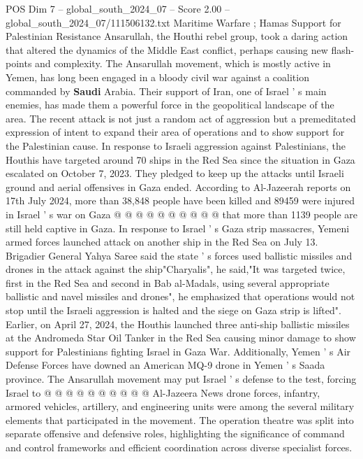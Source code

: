 \begin{textsample}{POS Dim 7 – global\_south\_2024\_07 – Score 2.00 – global\_south\_2024\_07/111506132.txt}  \label{ex:f7_pos_111}
Maritime Warfare ; Hamas Support for Palestinian Resistance Ansarullah, the Houthi rebel group, took a daring action that altered the dynamics of the Middle East conflict, perhaps causing new flash-points and complexity.
The Ansarullah movement, which is mostly active in Yemen, has long been engaged in a bloody civil war against a coalition commanded by \textbf{Saudi} Arabia.
Their support of Iran, one of Israel ' s main enemies, has made them a powerful force in the geopolitical landscape of the area.
The recent attack is not just a random act of aggression but a premeditated expression of intent to expand their area of operations and to show support for the Palestinian cause.
In response to Israeli aggression against Palestinians, the Houthis have targeted around 70 ships in the Red Sea since the situation in Gaza escalated on October 7, 2023.
They pledged to keep up the attacks until Israeli ground and aerial offensives in Gaza ended.
According to Al-Jazeerah reports on 17th July 2024, more than 38,848 people have been killed and 89459 were injured in Israel ' s war on Gaza @ @ @ @ @ @ @ @ @ @ that more than 1139 people are still held captive in Gaza.
In response to Israel ' s Gaza strip massacres, Yemeni armed forces launched attack on another ship in the Red Sea on July 13.
Brigadier General Yahya Saree said the state ' s forces used ballistic missiles and drones in the attack against the ship"Charyalis", he said,"It was targeted twice, first in the Red Sea and second in Bab al-Madals, using several appropriate ballistic and navel missiles and drones", he emphasized that operations would not stop until the Israeli aggression is halted and the siege on Gaza strip is lifted".
Earlier, on April 27, 2024, the Houthis launched three anti-ship ballistic missiles at the Andromeda Star Oil Tanker in the Red Sea causing minor damage to show support for Palestinians fighting Israel in Gaza War.
Additionally, Yemen ' s Air Defense Forces have downed an American MQ-9 drone in Yemen ' s Saada province.
The Ansarullah movement may put Israel ' s defense to the test, forcing Israel to @ @ @ @ @ @ @ @ @ @ Al-Jazeera News drone forces, infantry, armored vehicles, artillery, and engineering units were among the several military elements that participated in the movement.
The operation theatre was split into separate offensive and defensive roles, highlighting the significance of command and control frameworks and efficient coordination across diverse specialist forces.

\end{textsample}
